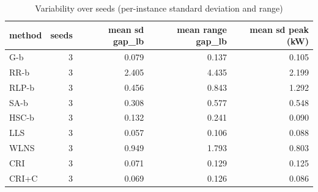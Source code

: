 \begin{table}[htbp]
\centering
\small
\caption{Variability over seeds (per-instance standard deviation and range)}
\label{tab:E4a_equal_budgets_b1_seeds}
\begin{tabular}{lrrrr}
\toprule
method & seeds & mean sd gap\_lb & mean range gap\_lb & mean sd peak (kW) \\
\midrule
G-b & 3 & 0.079 & 0.137 & 0.105 \\
RR-b & 3 & 2.405 & 4.435 & 2.199 \\
RLP-b & 3 & 0.456 & 0.843 & 1.292 \\
SA-b & 3 & 0.308 & 0.577 & 0.548 \\
HSC-b & 3 & 0.132 & 0.241 & 0.090 \\
LLS & 3 & 0.057 & 0.106 & 0.088 \\
WLNS & 3 & 0.949 & 1.793 & 0.803 \\
CRI & 3 & 0.071 & 0.129 & 0.125 \\
CRI+C & 3 & 0.069 & 0.126 & 0.086 \\
\bottomrule
\end{tabular}
\end{table}
